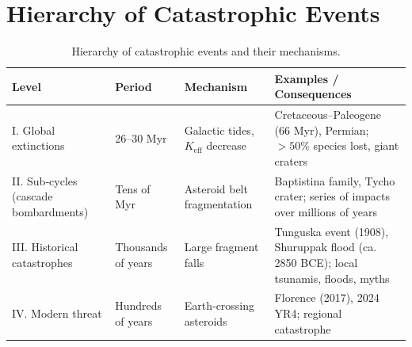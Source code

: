 \documentclass[11pt,a4paper]{article}
\begin{document}
	\section{Hierarchy of Catastrophic Events}
	
	\begin{table}[!ht]
		\centering
		\caption{Hierarchy of catastrophic events and their mechanisms.}
		\label{tab:hierarchy}
		\scriptsize
		\begin{tabular}{p{3.5cm}p{2.4cm}p{3.4cm}p{7.5cm}}
			\toprule
			\textbf{Level} & \textbf{Period} & \textbf{Mechanism} & \textbf{Examples / Consequences} \\
			\midrule
			I. Global extinctions & 26–30 Myr & Galactic tides, \(K_{\mathrm{eff}}\) decrease & Cretaceous–Paleogene (66 Myr), Permian; \(>50\%\) species lost, giant craters \\
			II. Sub‑cycles (cascade bombardments) & Tens of Myr & Asteroid belt fragmentation & Baptistina family, Tycho crater; series of impacts over millions of years \\
			III. Historical catastrophes & Thousands of years & Large fragment falls & Tunguska event (1908), Shuruppak flood (ca. 2850 BCE); local tsunamis, floods, myths \\
			IV. Modern threat & Hundreds of years & Earth‑crossing asteroids & Florence (2017), 2024 YR4; regional catastrophe \\
			\bottomrule
		\end{tabular}
	\end{table}
	
\end{document}

